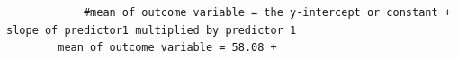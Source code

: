 \documentclass[12pt,letterpaper]{article}
\begin{document}
	\begin{verbatim}
			#mean of outcome variable = the y-intercept or constant + slope of predictor1 multiplied by predictor 1 
		mean of outcome variable = 58.08 +
		
	\end{verbatim}


\newpage	
\end{document}
